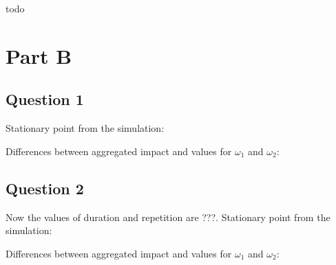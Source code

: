 \documentclass[a4paper]{article}
\begin{document}
todo

\section{Part B}

\subsection{Question 1}

Stationary point from the simulation:


Differences between aggregated impact and values for $\omega_{1}$ and $\omega_{2}$:


\subsection{Question 2}

Now the values of duration and repetition are ???. Stationary point from the simulation:


Differences between aggregated impact and values for $\omega_{1}$ and $\omega_{2}$:
\end{document}
